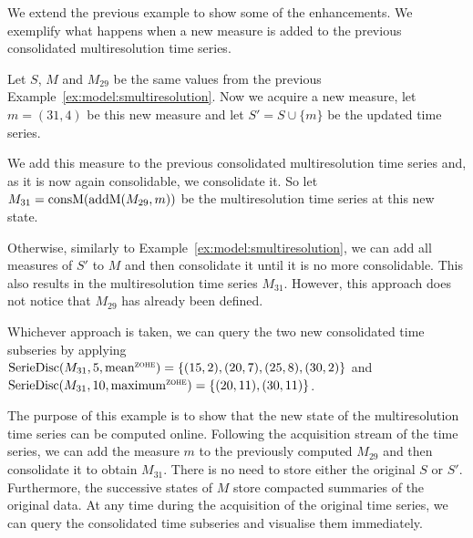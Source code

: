 We extend the previous example to show some of the 
enhancements.  We exemplify what happens when a new measure is
added to the previous consolidated multiresolution time series.
\begin{example}
  Let $S$, $M$ and $M_{29}$ be the same values from the previous
  Example~\ref{ex:model:smultiresolution}.  Now we acquire a new
  measure, let $m=(31,4)$ be this new measure and let $S' = S \cup
  \{m\}$ be the updated time series.

  We add this measure to the previous consolidated multiresolution
  time series and, as it is now again consolidable, we consolidate
  it. So let $M_{31} = \operatorname{consM}(\operatorname{addM}(M_{29},m))$ be the multiresolution
  time series at this new state.

  Otherwise, similarly to Example~\ref{ex:model:smultiresolution}, we
  can add all measures of $S'$ to $M$ and then consolidate it until it
  is no more consolidable. This also results in the multiresolution
  time series $M_{31}$. However, this approach does not notice that
  $M_{29}$ has already been defined.

  Whichever approach is taken, we can query the two new consolidated
  time subseries by applying $\seriedisc(M_{31},5,\allowbreak
  \meanz)=\{\allowbreak (15,\allowbreak 2),\allowbreak
  (20,7),\allowbreak (25,8),\allowbreak(30,2)\}$ and
  $\seriedisc(M_{31},\allowbreak 10,\allowbreak \maxz) =\allowbreak \{
  \allowbreak (20,11),\allowbreak (30,11)\}$.

  The purpose of this example is to show that the new state of the
  multiresolution time series can be computed online. Following the
  acquisition stream of the time series, we can add the measure $m$ to
  the previously computed $M_{29}$ and then consolidate it to obtain
  $M_{31}$. There is no need to store either the original $S$ or
  $S'$. Furthermore, the successive states of $M$ store compacted
  summaries of the original data. At any time during the acquisition
  of the original time series, we can query the consolidated time
  subseries and visualise them immediately.
\end{example}





